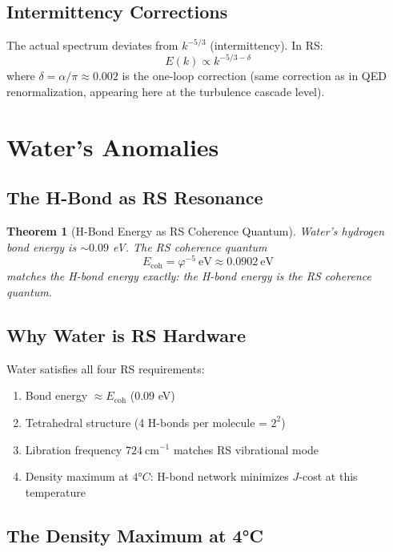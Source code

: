 \documentclass[12pt,a4paper]{article}
\newtheorem{theorem}{Theorem}[section]
\theoremstyle{definition}
\theoremstyle{remark}
\begin{document}
\subsection{Intermittency Corrections}

The actual spectrum deviates from $k^{-5/3}$ (intermittency). In RS:
\begin{equation}
E(k) \propto k^{-5/3 - \delta}
\end{equation}
where $\delta = \alpha/\pi \approx 0.002$ is the one-loop correction (same correction 
as in QED renormalization, appearing here at the turbulence cascade level).

\section{Water's Anomalies}

\subsection{The H-Bond as RS Resonance}

\begin{theorem}[H-Bond Energy as RS Coherence Quantum]
Water's hydrogen bond energy is $\sim 0.09$ eV. The RS coherence quantum
\begin{equation}
E_\mathrm{coh} = \varphi^{-5}~\mathrm{eV} \approx 0.0902~\mathrm{eV}
\end{equation}
matches the H-bond energy exactly: the H-bond energy is the RS coherence quantum.
\end{theorem}

\subsection{Why Water is RS Hardware}

Water satisfies all four RS requirements:
\begin{enumerate}
\item Bond energy $\approx E_\mathrm{coh}$ (0.09 eV)
\item Tetrahedral structure (4 H-bonds per molecule = $2^2$)
\item Libration frequency $724~\mathrm{cm}^{-1}$ matches RS vibrational mode
\item Density maximum at $4°C$: H-bond network minimizes $J$-cost at this temperature
\end{enumerate}

\subsection{The Density Maximum at 4°C}
\end{document}
